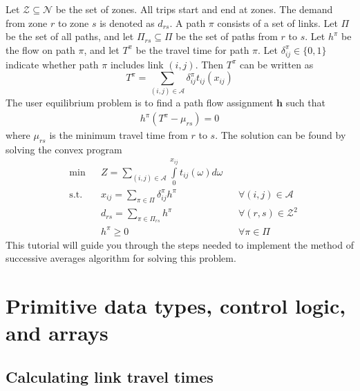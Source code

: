 \documentclass[11pt]{article}
\newcommand{\N}{\mathcal{N}}
\newcommand{\A}{\mathcal{A}}
\newcommand{\Z}{\mathcal{Z}}
\begin{document}
Let $\Z\subseteq\N$ be the set of zones. All trips start and end at zones. The demand from zone $r$ to zone $s$ is denoted as $d_{rs}$. A path $\pi$ consists of a set of links. Let $\Pi$ be the set of all paths, and let $\Pi_{rs}\subseteq\Pi$ be the set of paths from $r$ to $s$. Let $h^\pi$ be the flow on path $\pi$, and let $T^\pi$ be the travel time for path $\pi$. Let $\delta^\pi_{ij}\in\{0,1\}$ indicate whether path $\pi$ includes link $(i,j)$. Then $T^\pi$ can be written as
\begin{equation}
	T^\pi = \sum\limits_{(i,j)\in\A} \delta^\pi_{ij} t_{ij}(x_{ij})
\end{equation}
The user equilibrium problem is to find a path flow assignment $\mathbf{h}$ such that
\begin{align}
	h^\pi \left(T^\pi - \mu_{rs}\right) = 0
\end{align}
where $\mu_{rs}$ is the minimum travel time from $r$ to $s$. The solution can be found by solving the convex program
\begin{subequations}
\begin{align}
	& \min && Z=\sum\limits_{(i,j)\in\A} \int\limits_{0}^{x_{ij}} t_{ij}(\omega) d\omega && \\
	& \mathrm{s.t.} && x_{ij} = \sum\limits_{\pi \in \Pi} \delta^\pi_{ij} h^\pi && \forall (i,j)\in\A\\
	& && d_{rs} = \sum\limits_{\pi\in\Pi_{rs}} h^\pi && \forall (r,s)\in\Z^2\\
	& && h^\pi \geq 0 && \forall \pi\in\Pi 
\end{align}
\end{subequations}
This tutorial will guide you through the steps needed to implement the method of successive averages algorithm for solving this problem.






\section{Primitive data types, control logic, and arrays}

\subsection{Calculating link travel times}
\label{sec21}
\end{document}
